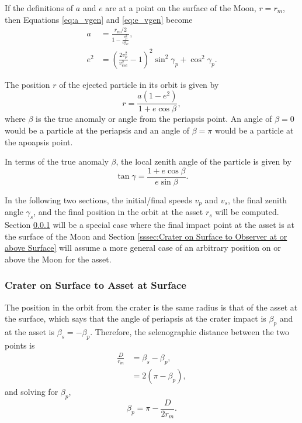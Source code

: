 \documentclass{article}
\begin{document}
If the definitions of $a$ and $e$ are at a point on the surface of the Moon, $r = r_m$, then Equations \eqref{eq:a_vgen} and \eqref{eq:e_vgen} become
\begin{align}
a &= \frac{r_m/2}{1 - \frac{v_p^2}{v_{esc}^2}},\label{eq:a_vrm}\\
e^2 &= \left(\frac{2v_p^2}{v_{esc}^2} - 1\right)^2\sin^2\gamma_p + \cos^2\gamma_p.\label{eq:e_vrm}
\end{align}

The position $r$ of the ejected particle in its orbit is given by
\begin{equation}\label{eq:r_orbit}
r = \frac{a(1-e^2)}{1+e\cos\beta},
\end{equation}
where $\beta$ is the true anomaly or angle from the periapsis point. An angle of $\beta=0$ would be a particle at the periapsis and an angle of $\beta=\pi$ would be a particle at the apoapsis point.

In terms of the true anomaly $\beta$, the local zenith angle of the particle is given by
\begin{equation}\label{eq:tan_gamma}
\tan\gamma = \frac{1+e\cos\beta}{e\sin\beta}.
\end{equation}

In the following two sections, the initial/final speeds $v_p$ and $v_s$, the final zenith angle $\gamma_s$, and the final position in the orbit at the asset $r_s$ will be computed. Section \ref{sssec:Crater on Surface to Observer at Surface} will be a special case where the final impact point at the asset is at the surface of the Moon and Section \ref{sssec:Crater on Surface to Observer at or above Surface} will assume a more general case of an arbitrary position on or above the Moon for the asset.

\subsubsection{Crater on Surface to Asset at Surface}\label{sssec:Crater on Surface to Observer at Surface}
The position in the orbit from the crater is the same radius is that of the asset at the surface, which says that the angle of periapsis at the crater impact is $\beta_p$ and at the asset is $\beta_s=-\beta_p$. Therefore, the selenographic distance between the two points is
\begin{align}
\frac{D}{r_m} &= \beta_s - \beta_p,\\
&= 2(\pi - \beta_p),
\end{align}
and solving for $\beta_p$,
\begin{equation}\label{eq:betap_specialcase}
\beta_p = \pi - \frac{D}{2r_m}.
\end{equation}
\end{document}
